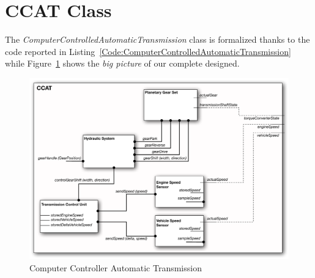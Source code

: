 \section{CCAT Class}
\label{Section:ComputerControlledAutomaticTransmission}
The \emph{ComputerControlledAutomaticTransmission} class is formalized thanks to the code reported in Listing~\ref{Code:ComputerControlledAutomaticTransmission} while Figure~\ref{Figure:CCAT} shows the \emph{big picture} of our complete designed.



\thispagestyle{empty}
\begin{figure}[!p]
\vspace{-3 cm}
\centerline{\includegraphics[scale=0.8,angle=-90]{images/CCAT.pdf}}
\caption{Computer Controller Automatic Transmission}
\label{Figure:CCAT}
\end{figure}
